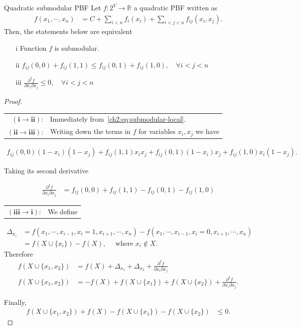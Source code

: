 \begin{proposition}{Quadratic submodular PBF}
	Let $f:2^V\rightarrow \mathbb{R}$ a quadratic PBF  written as
	\begin{align*}
		f(x_1,\cdots,x_n) &= C + \sum_{i<n}{f_{i}(x_i)} + \sum_{i<j<n}{f_{ij}(x_i,x_j)}.
	\end{align*}
	Then, the statements below are equivalent
	\begin{itemize}
	 	\item[i]{Function $f$ is submodular.}
		\item[ii]{ $f_{ij}(0,0) + f_{ij}(1,1) \leq f_{ij}(0,1) + f_{ij}(1,0), \quad \forall i<j<n$}
		\item[iii]{ $\frac{\partial^2 f}{\partial x_i\partial x_j} \leq 0, \quad \forall i<j<n$ }
	\end{itemize}
	\begin{proof}
	
	\begin{tabular}{rl}
	$\mathbf{(i\rightarrow ii)}$:& Immediately from~\cref{ch2:eq:submodular-local}. \\	
	$\mathbf{(ii\rightarrow iii)}$:&  Writing down the terms in $f$ for variables $x_i,x_j$ we have
	\end{tabular}
	
	\begin{align*}
		f_{ij}(0,0)(1-x_i)(1-x_j) + f_{ij}(1,1)x_ix_j + f_{ij}(0,1)(1-x_i)x_j + f_{ij}(1,0)x_i(1-x_j).
	\end{align*}

	Taking its second derivative

	\begin{align*}
		\frac{\partial^2f}{\partial x_i\partial x_j} &= f_{ij}(0,0) + f_{ij}(1,1) - f_{ij}(0,1) - f_{ij}(1,0)
	\end{align*}
	
	\begin{tabular}{rl}
		$\mathbf{(iii\rightarrow i)}$:& We define
	\end{tabular}		
	
		\begin{align*}
			\Delta_{x_i} &= f(x_1,\cdots,x_{i-1},x_i=1,x_{i+1},\cdots,x_n) - f(x_1,\cdots,x_{i-1},x_i=0,x_{i+1},\cdots,x_n) \\
			&= f(X \cup \{x_i\}) - f(X), \quad \text{ where } x_i \notin X.
		\end{align*}		 		
		Therefore
		\begin{align*}
			f( X \cup \{x_1,x_2\}) &= f(X) + \Delta_{x_1} + \Delta_{x_2} + \frac{ \partial^2 f}{\partial x_i \partial x_j} \\
			f( X \cup \{x_1,x_2\}) &= -f(X) + f(X \cup \{x_1\}) + f(X \cup \{x_2\}) + \frac{ \partial^2 f}{\partial x_i \partial x_j}.
		\end{align*}	
		
		Finally,
		\begin{align*}
			f( X \cup \{x_1,x_2\}) +f(X) - f(X \cup \{x_1\}) - f(X \cup \{x_2\}) &\leq 0.	
		\end{align*}
		
	\end{proof}
\end{proposition}

